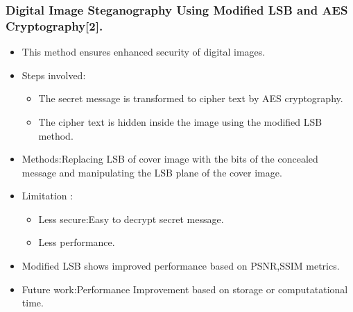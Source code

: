 \documentclass{beamer} %
\theoremstyle{definition} %
\begin{document}
\begin{frame}
\frametitle{Digital Image Steganography Using Modified LSB and AES Cryptography[2].}
\begin{itemize}
	\item{ This method ensures enhanced security of digital images.  }
	\item {Steps involved:}
	\begin{itemize}
	\item{The secret message is transformed to cipher text by AES cryptography.}
	\item{ The cipher text is hidden inside the image using the modified LSB method.}
	\end{itemize}
	\item{Methods:Replacing LSB of cover image with the bits of the concealed message and manipulating the LSB plane of the cover image.}
	\item{Limitation :}
	\begin{itemize}
		\item {Less secure:Easy to decrypt secret message.}
		\item {Less performance.}
	\end{itemize}
	\item{Modified LSB shows improved performance based on PSNR,SSIM metrics.} 
	\item{Future work:Performance Improvement based on storage or computatational time.}
\end{itemize}
\end{frame}
\end{document}
